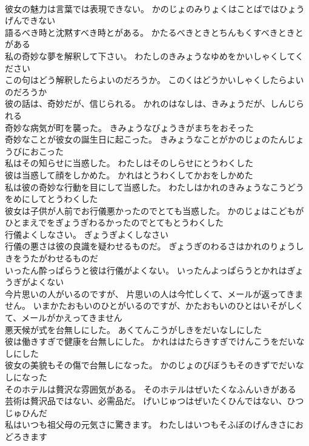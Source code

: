 \documentclass[8pt]{extreport}
\begin{document}
\begin{CJK}{UTF8}{min}
\\	彼女の魅力は言葉では表現できない。	かのじょのみりょくはことばではひょうげんできない 
\\	語るべき時と沈黙すべき時とがある。	かたるべきときとちんもくすべきときとがある 
\\	私の奇妙な夢を解釈して下さい。	わたしのきみょうなゆめをかいしゃくしてください 
\\	この句はどう解釈したらよいのだろうか。	このくはどうかいしゃくしたらよいのだろうか 
\\	彼の話は、奇妙だが、信じられる。	かれのはなしは、きみょうだが、しんじられる 
\\	奇妙な病気が町を襲った。	きみょうなびょうきがまちをおそった 
\\	奇妙なことが彼女の誕生日に起こった。	きみょうなことがかのじょのたんじょうびにおこった 
\\	私はその知らせに当惑した。	わたしはそのしらせにとうわくした 
\\	彼は当惑して顔をしかめた。	かれはとうわくしてかおをしかめた 
\\	私は彼の奇妙な行動を目にして当惑した。	わたしはかれのきみょうなこうどうをめにしてとうわくした 
\\	彼女は子供が人前でお行儀悪かったのでとても当惑した。	かのじょはこどもがひとまえでをぎょうぎわるかったのでとてもとうわくした 
\\	行儀よくしなさい。	ぎょうぎよくしなさい 
\\	行儀の悪さは彼の良識を疑わせるものだ。	ぎょうぎのわるさはかれのりょうしきをうたがわせるものだ 
\\	いったん酔っぱらうと彼は行儀がよくない。	いったんよっぱらうとかれはぎょうぎがよくない 
\\	今片思いの人がいるのですが、 片思いの人は今忙しくて、メールが返ってきません。	いまかたおもいのひとがいるのですが、かたおもいのひとはいそがしくて、メールがかえってきません 
\\	悪天候が式を台無しにした。	あくてんこうがしきをだいなしにした 
\\	彼は働きすぎで健康を台無しにした。	かれははたらきすぎでけんこうをだいなしにした 
\\	彼女の美貌もその傷で台無しになった。	かのじょのびぼうもそのきずでだいなしになった 
\\	そのホテルは贅沢な雰囲気がある。	そのホテルはぜいたくなふんいきがある 
\\	芸術は贅沢品ではない、必需品だ。	げいじゅつはぜいたくひんではない、ひつじゅひんだ 
\\	私はいつも祖父母の元気さに驚きます。	わたしはいつもそふぼのげんきさにおどろきます 

\end{CJK}
\end{document}
